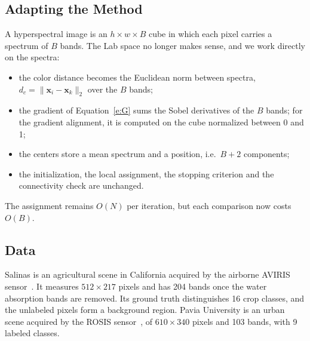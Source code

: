 \subsection{Adapting the Method}
A hyperspectral image is an $h \times w \times B$ cube in which
each pixel carries a spectrum of $B$ bands. The Lab space
no longer makes sense, and we work directly on the spectra:
\begin{itemize}
\item the color distance becomes the Euclidean norm between spectra, $d_c = \lVert \mathbf{x}_i - \mathbf{x}_k \rVert_2$ over the $B$ bands;
\item the gradient of Equation~\eqref{e:G} sums the Sobel derivatives of the $B$ bands; for the gradient alignment,
it is computed on the cube normalized between 0 and 1;
\item the centers store a mean spectrum and a position, i.e.\ $B + 2$ components;
\item the initialization, the local assignment, the stopping criterion and
the connectivity check are unchanged.
\end{itemize}
The assignment remains $O(N)$ per iteration, but each comparison now costs $O(B)$.

\subsection{Data}
Salinas is an agricultural scene in California acquired
by the airborne AVIRIS sensor~\cite{ehu}. It measures $512 \times 217$ pixels and has 204 bands once the
water absorption bands are removed. Its ground truth distinguishes
16 crop classes, and the unlabeled pixels form
a background region. Pavia University is an urban scene
acquired by the ROSIS sensor~\cite{ehu}, of $610 \times 340$ pixels and
103 bands, with 9 labeled classes.

